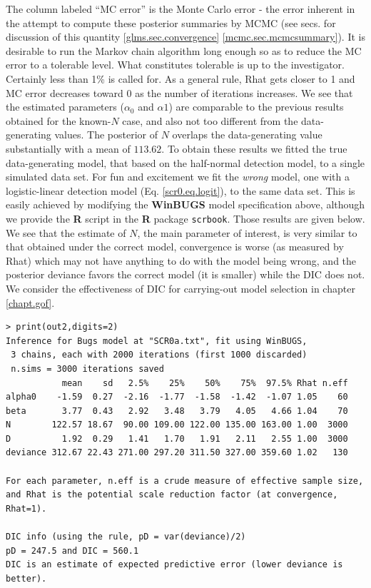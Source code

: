 The column labeled ``MC error'' is the Monte Carlo error - the error
inherent in the attempt to compute these posterior summaries by
MCMC
(see secs.  for discussion of this quantity
\ref{glms.sec.convergence} \ref{mcmc.sec.mcmcsummary}).
It is desirable to run the Markov chain algorithm long enough so
as to reduce the MC error to a tolerable level. What constitutes
tolerable is up to the investigator. Certainly less than 1\% is called
for. As a general rule, Rhat gets closer to 1 and MC error decreases
toward 0 as the number of iterations increases.  We see that the
estimated parameters ($\alpha_0$ and $\alpha1$) are comparable to the
previous results obtained for the known-$N$ case, and also not too
different from the data-generating values. The posterior of $N$
overlaps the data-generating value substantially with a mean of
$113.62$.  To obtain these results we fitted the true data-generating
model, that based on the half-normal detection model, to a single
simulated data set. For fun and excitement we fit the {\it wrong}
model, one with a logistic-linear detection model
(Eq. \ref{scr0.eq.logit}),
to the same  
data set. This is easily achieved by modifying the {\bf WinBUGS} model
specification above, although we provide the {\bf R} script in the
{\bf R} package \mbox{\tt scrbook}.
Those results are given below. We see that the estimate of
$N$, the main parameter of interest, is very similar to that obtained
under the correct model, convergence is worse (as measured by Rhat)
which may not have anything to do with the model being wrong,
and the posterior deviance favors the correct model (it is smaller) while the DIC does not.
We consider 
 the effectiveness of DIC for carrying-out model selection in chapter
\ref{chapt.gof}.
{\small
\begin{verbatim}
> print(out2,digits=2)
Inference for Bugs model at "SCR0a.txt", fit using WinBUGS,
 3 chains, each with 2000 iterations (first 1000 discarded)
 n.sims = 3000 iterations saved
           mean    sd   2.5%    25%    50%    75%  97.5% Rhat n.eff
alpha0    -1.59  0.27  -2.16  -1.77  -1.58  -1.42  -1.07 1.05    60
beta       3.77  0.43   2.92   3.48   3.79   4.05   4.66 1.04    70
N        122.57 18.67  90.00 109.00 122.00 135.00 163.00 1.00  3000
D          1.92  0.29   1.41   1.70   1.91   2.11   2.55 1.00  3000
deviance 312.67 22.43 271.00 297.20 311.50 327.00 359.60 1.02   130

For each parameter, n.eff is a crude measure of effective sample size,
and Rhat is the potential scale reduction factor (at convergence, Rhat=1).

DIC info (using the rule, pD = var(deviance)/2)
pD = 247.5 and DIC = 560.1
DIC is an estimate of expected predictive error (lower deviance is better).
\end{verbatim}
}

